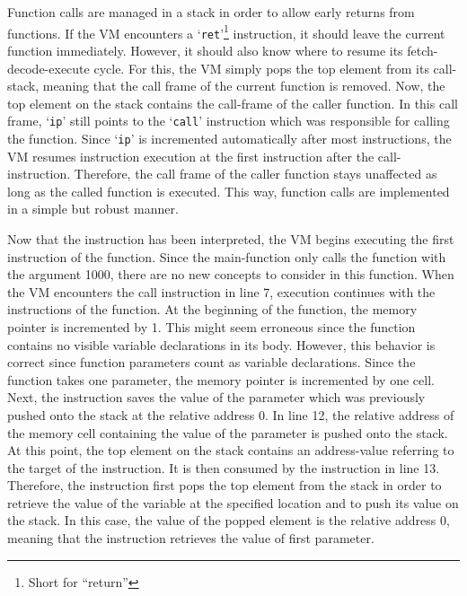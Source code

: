 Function calls are managed in a stack in order to allow early returns from functions.
If the VM encounters a `\texttt{ret}'\footnote{Short for \enquote{return}} instruction, it should leave the current function immediately.
However, it should also know where to resume its fetch-decode-execute cycle.
For this, the VM simply pops the top element from its call-stack, meaning that the call frame of the current function is removed.
Now, the top element on the stack contains the call-frame of the caller function.
In this call frame, `\texttt{ip}' still points to the `\texttt{call}' instruction which was responsible for calling the function.
Since `\texttt{ip}' is incremented automatically after most instructions, the VM resumes instruction execution at the first instruction after the call-instruction.
Therefore, the call frame of the caller function stays unaffected as long as the called function is executed.
This way, function calls are implemented in a simple but robust manner.

Now that the  instruction has been interpreted, the VM begins executing the first instruction of the  function.
Since the main-function only calls the  function with the argument 1000, there are no new concepts to consider in this function.
When the VM encounters the call instruction in line 7, execution continues with the instructions of the  function.
At the beginning of the  function, the memory pointer is incremented by 1.
This might seem erroneous since the  function contains no visible variable declarations in its body.
However, this behavior is correct since function parameters count as variable declarations.
Since the function takes one parameter, the memory pointer is incremented by one cell.
Next, the  instruction saves the value of the parameter which was previously pushed onto the stack at the relative address 0.
In line 12, the relative address of the memory cell containing the value of the parameter is pushed onto the stack.
At this point, the top element on the stack contains an address-value referring to the target of the  instruction.
It is then consumed by the  instruction in line 13.
Therefore, the instruction first pops the top element from the stack in order to
retrieve the value of the variable at the specified location and to push its value on the stack.
In this case, the value of the popped element is the relative address 0, meaning that the instruction retrieves the value of first parameter.

